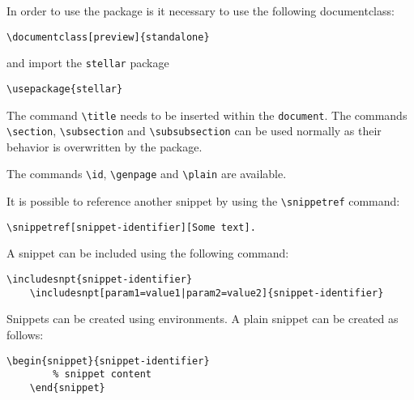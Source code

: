 \documentclass[a4paper]{article}
\begin{document}
In order to use the package is it necessary to use the following documentclass:
\begin{lstlisting}[style=boxed, style=LaTeX]
    \documentclass[preview]{standalone}
\end{lstlisting}
and import the \texttt{stellar} package
\begin{lstlisting}[style=boxed, style=LaTeX]
    \usepackage{stellar}
\end{lstlisting}

The command \lstinline[style=LaTeX]{\title} needs to be inserted within the \texttt{document}.
The commands \lstinline[style=LaTeX]{\section}, \lstinline[style=LaTeX]{\subsection} and
\lstinline[style=LaTeX]{\subsubsection} can be used normally as their behavior is overwritten by the package.

The commands \lstinline[style=LaTeX]{\id}, \lstinline[style=LaTeX]{\genpage}
and \lstinline[style=LaTeX]{\plain} are available.

It is possible to reference another snippet by using the \lstinline[style=LaTeX]{\snippetref} command:
\begin{lstlisting}[style=boxed, style=LaTeX]
    \snippetref[snippet-identifier][Some text].
\end{lstlisting}

A snippet can be included using the following command:
\begin{lstlisting}[style=boxed, style=LaTeX]
    \includesnpt{snippet-identifier}
    \includesnpt[param1=value1|param2=value2]{snippet-identifier}
\end{lstlisting}

Snippets can be created using environments. A plain snippet can be created as follows:
\begin{lstlisting}[style=boxed, style=LaTeX]
    \begin{snippet}{snippet-identifier}
        % snippet content
    \end{snippet}
\end{lstlisting}
\end{document}
